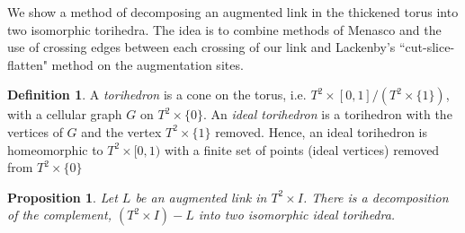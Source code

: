 \documentclass[11pt]{amsart}
\theoremstyle{plain}
\newtheorem{prop}[theorem]{Proposition}
\theoremstyle{definition}
\newtheorem{define}[theorem]{Definition}
\begin{document}
We show a method of decomposing an augmented link in the thickened torus into two isomorphic torihedra. The idea is to combine methods of Menasco \cite{Menasco} and the use of crossing edges between each crossing of our link and Lackenby's ``cut-slice-flatten" method \cite{lackenby} on the augmentation sites.   


\begin{define}\cite{CKP2} \label{def:torihedron}
 A \emph{torihedron} is a cone on the torus, i.e. $T^2 \times [0,1]/(T^2 \times \{1\})$, with a cellular graph $G$ on $T^2 \times \{0\}$. An \emph{ideal torihedron} is a torihedron with the vertices of $G$ and the vertex $T^2 \times \{1\}$ removed. Hence, an ideal torihedron is homeomorphic to $T^2 \times [0,1)$ with a finite set of points (ideal vertices) removed from $T^2 \times \{0\}$ 
\end{define}

\begin{prop}\label{p:tori_decomp}
Let $L$ be an augmented link in $T^2 \times I$.
There is a decomposition of the complement,
$(T^2 \times I) - L$ into two isomorphic ideal torihedra.
\end{prop}
\end{document}

